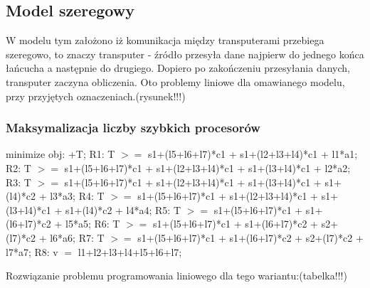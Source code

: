 \documentclass[a4paper,11pt, titlepage]{article}
\begin{document}
\subsection{Model szeregowy}
W modelu tym założono iż komunikacja między transputerami przebiega szeregowo,  to znaczy transputer - źródło przesyła dane najpierw do jednego końca łańcucha a następnie do drugiego. Dopiero po zakończeniu przesyłania danych, transputer zaczyna obliczenia. Oto problemy liniowe dla omawianego modelu, przy przyjętych oznaczeniach.(rysunek!!!)

\subsubsection{Maksymalizacja liczby szybkich procesorów}
\begin{flushleft}

minimize obj: +T;\linebreak
\linebreak
R1: T $>=$ s1+(l5+l6+l7)*c1 + s1+(l2+l3+l4)*c1 + l1*a1;\linebreak
R2: T $>=$ s1+(l5+l6+l7)*c1 + s1+(l2+l3+l4)*c1 + s1+(l3+l4)*c1 + l2*a2;\linebreak
R3: T $>=$ s1+(l5+l6+l7)*c1 + s1+(l2+l3+l4)*c1 + s1+(l3+l4)*c1 + s1+(l4)*c2 + l3*a3;\linebreak
R4: T $>=$ s1+(l5+l6+l7)*c1 + s1+(l2+l3+l4)*c1 + s1+(l3+l4)*c1 + s1+(l4)*c2 + l4*a4;\linebreak
R5: T $>=$ s1+(l5+l6+l7)*c1 + s1+(l6+l7)*c2 + l5*a5;\linebreak
R6: T $>=$ s1+(l5+l6+l7)*c1 + s1+(l6+l7)*c2 + s2+(l7)*c2 + l6*a6;\linebreak
R7: T $>=$ s1+(l5+l6+l7)*c1 + s1+(l6+l7)*c2 + s2+(l7)*c2 + l7*a7;\linebreak
R8: v $=$ l1+l2+l3+l4+l5+l6+l7;\linebreak
\end{flushleft}

Rozwiązanie problemu programowania liniowego dla tego wariantu:(tabelka!!!)
\end{document}
